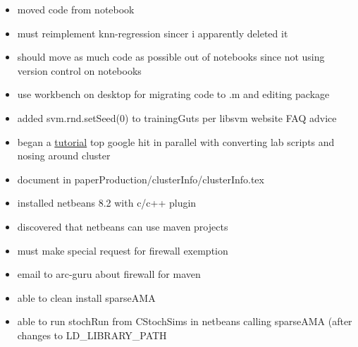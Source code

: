 \documentclass[hyperref]{labbook}
\begin{document}


\begin{itemize}
\item moved code from notebook
\end{itemize}


\begin{itemize}
\item must reimplement knn-regression  sincer i apparently deleted it
\item should move as much code as possible out of notebooks since not using version control on notebooks
\item use workbench on desktop for migrating code to .m and editing package
\end{itemize}

\begin{itemize}
\item added svm.rnd.setSeed(0) to trainingGuts per libsvm website FAQ advice
\end{itemize}

\begin{itemize}
\item began a \href{http://www.ceci-hpc.be/slurm_tutorial.html}{tutorial} top google hit in parallel with converting lab scripts and nosing around cluster
\item document in paperProduction/clusterInfo/clusterInfo.tex

\end{itemize}

\begin{itemize}
\item installed netbeans 8.2 with c/c++ plugin
\item discovered that netbeans can use maven projects
\item must make special request for firewall exemption
\item email to arc-guru about firewall for maven
\item able to clean install sparseAMA
\item able to run stochRun from CStochSims in netbeans calling sparseAMA (after changes to LD\_LIBRARY\_PATH
\end{itemize}
\end{document}
